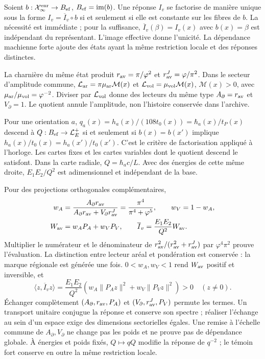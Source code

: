 Soient $b:\mathcal X_\infty^{\rm enr}\to B_{\rm ef}$, $B_{\rm ef}=\operatorname{im}(b)$. Une réponse $I_v$ se factorise de manière unique sous la forme $I_v=\overline I_v\circ b$ si et seulement si elle est constante sur les fibres de $b$. La nécessité est immédiate ; pour la suffisance, $\overline I_v(\beta)=I_v(x)$ avec $b(x)=\beta$ est indépendant du représentant. L’image effective donne l’unicité. La dépendance machienne forte ajoute des états ayant la même restriction locale et des réponses distinctes.

La charnière du même état produit $r_{\rm av}=\pi/\varphi^2$ et $r_{\rm av}^J=\varphi/\pi^2$. Dans le secteur d’amplitude commune, $\mathcal L_{\rm ar}=\pi\mu_{\rm ar}\mathcal M(x)$ et $\mathcal L_{\rm vol}=\mu_{\rm vol}\mathcal M(x)$, $\mathcal M(x)>0$, avec $\mu_{\rm ar}/\mu_{\rm vol}=\varphi^{-2}$. Diviser par $\mathcal L_{\rm vol}$ donne des lecteurs du même type $A_\partial=r_{\rm av}$ et $V_\partial=1$. Le quotient annule l’amplitude, non l’histoire conservée dans l’archive.

Pour une orientation $a$, $q_a(x)=h_a(x)/(108t_0(x))=\hbar_a(x)/t_P(x)$ descend à $Q:B_{\rm ef}\to\mathcal L_E^+$ si et seulement si $b(x)=b(x')$ implique $h_a(x)/t_0(x)=h_a(x')/t_0(x')$. C’est le critère de factorisation appliqué à l’horloge. Les cartes fixes et les cartes variables dont le quotient descend le satisfont. Dans la carte radiale, $Q=\hbar_ac/L$. Avec des énergies de cette même droite, $E_1E_2/Q^2$ est adimensionnel et indépendant de la base.

Pour des projections orthogonales complémentaires,
\begin{align}
w_A&=\frac{A_\partial r_{\rm av}}
{A_\partial r_{\rm av}+V_\partial r_{\rm av}^J}
=\frac{\pi^4}{\pi^4+\varphi^5},\qquad w_V=1-w_A,
\label{hmtcuatro:gea:pesos}\\
W_{\rm av}&=w_AP_A+w_VP_V,\qquad
\overline I_v=\frac{E_1E_2}{Q^2}W_{\rm av}.
\label{hmtcuatro:gea:respuesta}
\end{align}
Multiplier le numérateur et le dénominateur de $r_{\rm av}^2/(r_{\rm av}^2+r_{\rm av}^J)$ par $\varphi^4\pi^2$ prouve l’évaluation. La distinction entre lecteur aréal et pondération est conservée : la marque régionale est générée une fois. $0<w_A,w_V<1$ rend $W_{\rm av}$ positif et inversible, et
\[
\langle z,\overline I_vz\rangle
=\frac{E_1E_2}{Q^2}
(w_A\|P_Az\|^2+w_V\|P_Vz\|^2)>0\quad(z\ne0).
\]
Échanger complètement $(A_\partial,r_{\rm av},P_A)$ et $(V_\partial,r_{\rm av}^J,P_V)$ permute les termes. Un transport unitaire conjugue la réponse et conserve son spectre ; réaliser l’échange au sein d’un espace exige des dimensions sectorielles égales. Une remise à l’échelle commune de $A_\partial,V_\partial$ ne change pas les poids et ne prouve pas de dépendance globale. À énergies et poids fixés, $Q\mapsto qQ$ modifie la réponse de $q^{-2}$ ; le témoin fort conserve en outre la même restriction locale.

